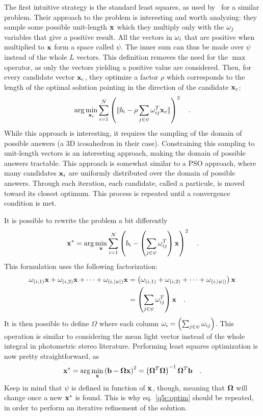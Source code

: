 \documentclass{report}
\begin{document}
The first intuitive strategy is the standard least squares, as used by~\cite{hung-wacv-15} for a similar problem. Their approach to the problem is interesting and worth analyzing: they sample some possible unit-length $\mathbf{x}$ which they multiply only with the $\mathbf{\omega}_j$ variables that give a positive result. All the vectors in $\mathbf{\omega}_i$ that are positive when multiplied to $\mathbf{x}$ form a space called $\psi$. The inner sum can thus be made over $\psi$ instead of the whole $L$ vectors. This definition removes the need for the $\max$ operator, as only the vectors yielding a positive value are considered. Then, for every candidate vector $\mathbf{x}_c$, they optimize a factor $\rho$ which corresponds to the length of the optimal solution pointing in the direction of the candidate $\mathbf{x}_c$:
\begin{equation}
\arg \min_{\mathbf{x}_c} \sum_{i=1}^N \left( \| b_i - \rho \sum_{j \in \psi}\mathbf{\omega}_{ij}^T\mathbf{x}_c \| \right)^2
\quad.
\end{equation}
While this approach is interesting, it requires the sampling of the domain of possible answers (a 3D icosahedron in their case). Constraining this sampling to unit-length vectors is an interesting approach, making the domain of possible answers tractable. This approach is somewhat similar to a PSO approach, where many candidates $\mathbf{x}_i$ are uniformly distributed over the domain of possible answers. Through each iteration, each candidate, called a particule, is moved toward its closest optimum. This process is repeated until a convergence condition is met.

It is possible to rewrite the problem a bit differently
\begin{equation}
\mathbf{x^*} = \arg \min_{\mathbf{x}} \sum_{i=1}^N \left( b_i - \left( \sum_{j\in\psi} \mathbf{\omega}_{ij}^T\right) \mathbf{x} \right)^2
\quad.
\end{equation}
This formulation uses the following factorization:
\begin{align}
\mathbf{\omega}_{(i,1)}\mathbf{x} + \mathbf{\omega}_{(i,2)}\mathbf{x} + \dots + \mathbf{\omega}_{(i,\lvert \psi \rvert)}\mathbf{x} &= \left(\mathbf{\omega}_{(i,1)} + \mathbf{\omega}_{(i,2)} + \dots + \mathbf{\omega}_{(i,\lvert \psi \rvert)}\right)\mathbf{x} \\
&= \left( \sum_{j\in\psi} \mathbf{\omega}_{ij}^T\right) \mathbf{x}
\quad.
\end{align}
It is then possible to define $\Omega$ where each column $\omega_i = \left( \sum_{j\in\psi} \mathbf{\omega}_{ij}\right)$. This operation is similar to considering the mean light vector instead of the whole integral in photometric stereo literature. Performing least squares optimization is now pretty straightforward, as
\begin{equation}
\mathbf{x^*} = \arg \min_{\mathbf{x}} \left( \mathbf{b} - \mathbf{\Omega}\mathbf{x} \right)^2 = \left(\mathbf{\Omega}^T \mathbf{\Omega}\right)^{-1}\mathbf{\Omega}^T \mathbf{b}
\quad.
\label{q5c:optim}
\end{equation}
Keep in mind that $\psi$ is defined in function of $\mathbf{x}$, though, meaning that $\mathbf{\Omega}$ will change once a new $\mathbf{x^*}$ is found. This is why eq.~\eqref{q5c:optim} should be repeated, in order to perform an iterative refinement of the solution.
\end{document}
